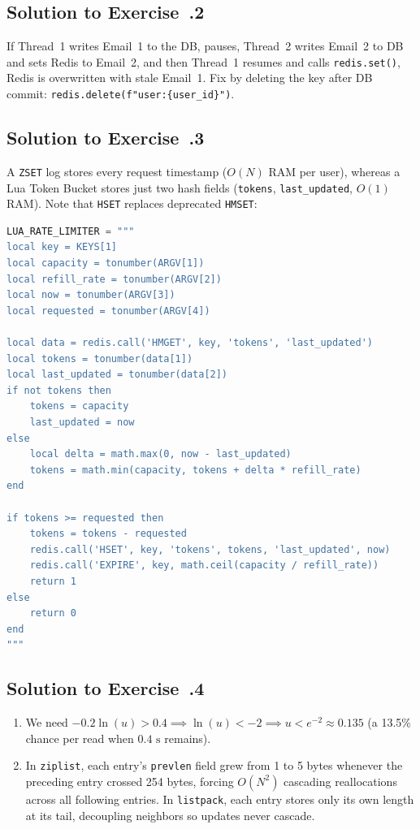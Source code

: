 \subsection*{Solution to Exercise~\thechapter.2}
If Thread~1 writes Email~1 to the DB, pauses, Thread~2 writes Email~2 to DB and sets Redis to Email~2, and then Thread~1 resumes and calls \texttt{redis.set()}, Redis is overwritten with stale Email~1. Fix by deleting the key after DB commit: \texttt{redis.delete(f"user:\{user\_id\}")}.

\subsection*{Solution to Exercise~\thechapter.3}
A \texttt{ZSET} log stores every request timestamp ($O(N)$ RAM per user), whereas a Lua Token Bucket stores just two hash fields (\texttt{tokens}, \texttt{last\_updated}, $O(1)$ RAM). Note that \texttt{HSET} replaces deprecated \texttt{HMSET}:
\begin{lstlisting}[language=Python]
LUA_RATE_LIMITER = """
local key = KEYS[1]
local capacity = tonumber(ARGV[1])
local refill_rate = tonumber(ARGV[2])
local now = tonumber(ARGV[3])
local requested = tonumber(ARGV[4])

local data = redis.call('HMGET', key, 'tokens', 'last_updated')
local tokens = tonumber(data[1])
local last_updated = tonumber(data[2])
if not tokens then
    tokens = capacity
    last_updated = now
else
    local delta = math.max(0, now - last_updated)
    tokens = math.min(capacity, tokens + delta * refill_rate)
end

if tokens >= requested then
    tokens = tokens - requested
    redis.call('HSET', key, 'tokens', tokens, 'last_updated', now)
    redis.call('EXPIRE', key, math.ceil(capacity / refill_rate))
    return 1
else
    return 0
end
"""
\end{lstlisting}

\subsection*{Solution to Exercise~\thechapter.4}
\begin{enumerate}[leftmargin=18pt]
  \item We need $-0.2 \ln(u) > 0.4 \implies \ln(u) < -2 \implies u < e^{-2} \approx 0.135$ (a 13.5\% chance per read when $0.4\text{ s}$ remains).
  \item In \texttt{ziplist}, each entry's \texttt{prevlen} field grew from 1 to 5 bytes whenever the preceding entry crossed 254 bytes, forcing $O(N^2)$ cascading reallocations across all following entries. In \texttt{listpack}, each entry stores only its own length at its tail, decoupling neighbors so updates never cascade.
\end{enumerate}

